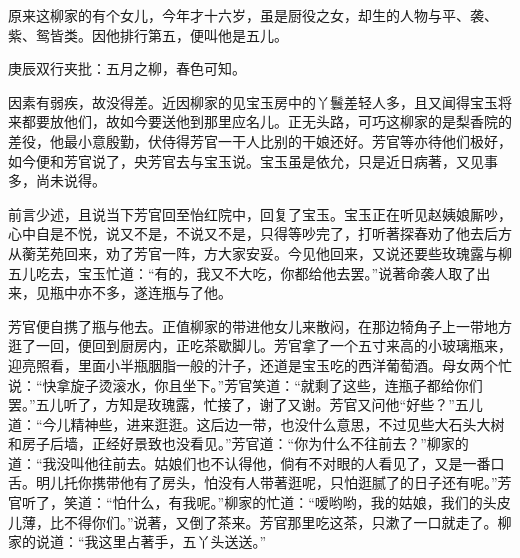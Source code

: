 \begin{parag}


    原来这柳家的有个女儿，今年才十六岁，虽是厨役之女，却生的人物与平、袭、紫、鸳皆类。因他排行第五，便叫他是五儿。\begin{note}庚辰双行夹批：五月之柳，春色可知。\end{note}因素有弱疾，故没得差。近因柳家的见宝玉房中的丫鬟差轻人多，且又闻得宝玉将来都要放他们，故如今要送他到那里应名儿。正无头路，可巧这柳家的是梨香院的差役，他最小意殷勤，伏侍得芳官一干人比别的干娘还好。芳官等亦待他们极好，如今便和芳官说了，央芳官去与宝玉说。宝玉虽是依允，只是近日病著，又见事多，尚未说得。
\end{parag}


\begin{parag}


    前言少述，且说当下芳官回至怡红院中，回复了宝玉。宝玉正在听见赵姨娘厮吵，心中自是不悦，说又不是，不说又不是，只得等吵完了，打听著探春劝了他去后方从蘅芜苑回来，劝了芳官一阵，方大家安妥。今见他回来，又说还要些玫瑰露与柳五儿吃去，宝玉忙道：“有的，我又不大吃，你都给他去罢。”说著命袭人取了出来，见瓶中亦不多，遂连瓶与了他。
\end{parag}


\begin{parag}


    芳官便自携了瓶与他去。正值柳家的带进他女儿来散闷，在那边犄角子上一带地方逛了一回，便回到厨房内，正吃茶歇脚儿。芳官拿了一个五寸来高的小玻璃瓶来，迎亮照看，里面小半瓶胭脂一般的汁子，还道是宝玉吃的西洋葡萄酒。母女两个忙说：“快拿旋子烫滚水，你且坐下。”芳官笑道：“就剩了这些，连瓶子都给你们罢。”五儿听了，方知是玫瑰露，忙接了，谢了又谢。芳官又问他“好些？”五儿道：“今儿精神些，进来逛逛。这后边一带，也没什么意思，不过见些大石头大树和房子后墙，正经好景致也没看见。”芳官道：“你为什么不往前去？”柳家的道：“我没叫他往前去。姑娘们也不认得他，倘有不对眼的人看见了，又是一番口舌。明儿托你携带他有了房头，怕没有人带著逛呢，只怕逛腻了的日子还有呢。”芳官听了，笑道：“怕什么，有我呢。”柳家的忙道：“嗳哟哟，我的姑娘，我们的头皮儿薄，比不得你们。”说著，又倒了茶来。芳官那里吃这茶，只漱了一口就走了。柳家的说道：“我这里占著手，五丫头送送。”
\end{parag}


